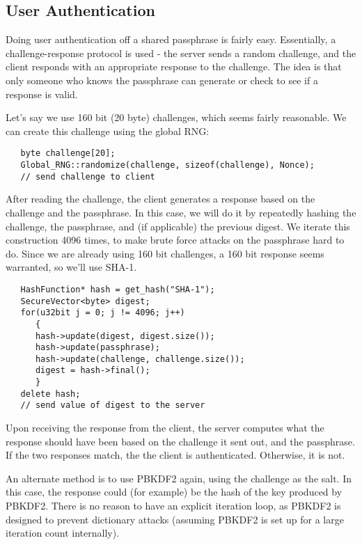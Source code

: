 \documentclass{article}
\begin{document}
\subsection{User Authentication}

Doing user authentication off a shared passphrase is fairly easy. Essentially,
a challenge-response protocol is used - the server sends a random challenge,
and the client responds with an appropriate response to the challenge. The idea
is that only someone who knows the passphrase can generate or check to see if a
response is valid.

Let's say we use 160 bit (20 byte) challenges, which seems fairly
reasonable. We can create this challenge using the global RNG:

\begin{verbatim}
   byte challenge[20];
   Global_RNG::randomize(challenge, sizeof(challenge), Nonce);
   // send challenge to client
\end{verbatim}

After reading the challenge, the client generates a response based on the
challenge and the passphrase. In this case, we will do it by repeatedly hashing
the challenge, the passphrase, and (if applicable) the previous digest. We
iterate this construction 4096 times, to make brute force attacks on the
passphrase hard to do. Since we are already using 160 bit challenges, a 160 bit
response seems warranted, so we'll use SHA-1.

\begin{verbatim}
   HashFunction* hash = get_hash("SHA-1");
   SecureVector<byte> digest;
   for(u32bit j = 0; j != 4096; j++)
      {
      hash->update(digest, digest.size());
      hash->update(passphrase);
      hash->update(challenge, challenge.size());
      digest = hash->final();
      }
   delete hash;
   // send value of digest to the server
\end{verbatim}

Upon receiving the response from the client, the server computes what the
response should have been based on the challenge it sent out, and the
passphrase. If the two responses match, the the client is authenticated.
Otherwise, it is not.

An alternate method is to use PBKDF2 again, using the challenge as the salt. In
this case, the response could (for example) be the hash of the key produced by
PBKDF2. There is no reason to have an explicit iteration loop, as PBKDF2 is
designed to prevent dictionary attacks (assuming PBKDF2 is set up for a large
iteration count internally).
\end{document}
